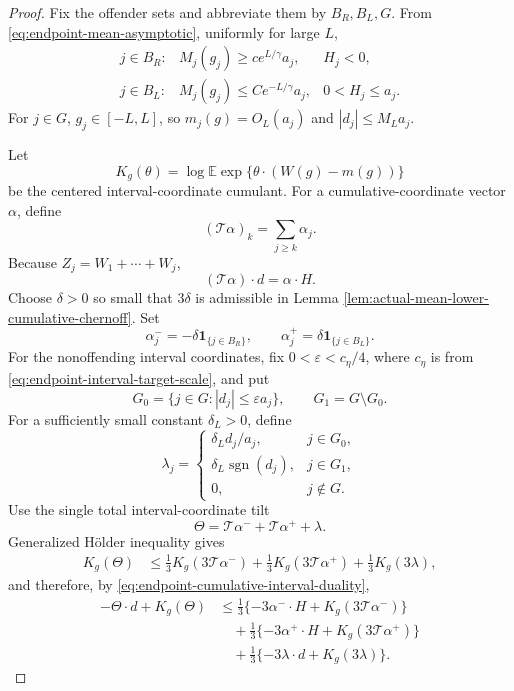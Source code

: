 \documentclass[11pt]{article}
\theoremstyle{remark}
\newcommand{\Ee}{\mathbb E}
\newcommand{\one}{\mathbf 1}
\begin{document}
\begin{proof}
Fix the offender sets and abbreviate them by \(B_R,B_L,G\).  From
\eqref{eq:endpoint-mean-asymptotic}, uniformly for large \(L\),
\[
\begin{array}{lll}
 j\in B_R:&M_j(g_j)\ge ce^{L/\gamma}a_j,&H_j<0,\\[1mm]
 j\in B_L:&M_j(g_j)\le Ce^{-L/\gamma}a_j,&0<H_j\le a_j.
\end{array}
\tag{8.18}\label{eq:endpoint-offender-geometry}
\]
For \(j\in G\), \(g_j\in[-L,L]\), so
\(m_j(g)=O_L(a_j)\) and \(|d_j|\le M_La_j\).

Let
\[
        K_g(\theta)=\log\Ee
        \exp\{\theta\cdot(W(g)-m(g))\}
\]
be the centered interval-coordinate cumulant.  For a cumulative-coordinate
vector \(\alpha\), define
\[
        (\mathcal T\alpha)_k=\sum_{j\ge k}\alpha_j.
\]
Because \(Z_j=W_1+\cdots+W_j\),
\[
        (\mathcal T\alpha)\cdot d=\alpha\cdot H.
\tag{8.19}\label{eq:endpoint-cumulative-interval-duality}
\]
Choose \(\delta>0\) so small that \(3\delta\) is admissible in Lemma
\ref{lem:actual-mean-lower-cumulative-chernoff}.  Set
\[
        \alpha_j^-=-\delta\one_{\{j\in B_R\}},
        \qquad
        \alpha_j^+=\delta\one_{\{j\in B_L\}}.
\]
For the nonoffending interval coordinates, fix
\(0<\varepsilon<c_\eta/4\), where \(c_\eta\) is from
\eqref{eq:endpoint-interval-target-scale}, and put
\[
        G_0=\{j\in G:|d_j|\le\varepsilon a_j\},
        \qquad G_1=G\setminus G_0.
\]
For a sufficiently small constant \(\delta_L>0\), define
\[
        \lambda_j=
        \begin{cases}
        \delta_Ld_j/a_j,&j\in G_0,\\
        \delta_L\operatorname{sgn}(d_j),&j\in G_1,\\
        0,&j\notin G.
        \end{cases}
\]
Use the single total interval-coordinate tilt
\[
        \Theta=\mathcal T\alpha^-+\mathcal T\alpha^++\lambda.
\]
Generalized H\"older inequality gives
\[
\begin{aligned}
K_g(\Theta)
&\le\frac13K_g(3\mathcal T\alpha^-)
 +\frac13K_g(3\mathcal T\alpha^+)
 +\frac13K_g(3\lambda),
\end{aligned}
\tag{8.20}\label{eq:endpoint-holder-cumulant}
\]
and therefore, by \eqref{eq:endpoint-cumulative-interval-duality},
\[
\begin{aligned}
-\Theta\cdot d+K_g(\Theta)
&\le\frac13\{-3\alpha^-\cdot H+K_g(3\mathcal T\alpha^-)\}\\
&\quad+\frac13\{-3\alpha^+\cdot H+K_g(3\mathcal T\alpha^+)\}\\
&\quad+\frac13\{-3\lambda\cdot d+K_g(3\lambda)\}.
\end{aligned}
\tag{8.21}\label{eq:endpoint-holder-exponent}
\]


\end{proof}
\end{document}
